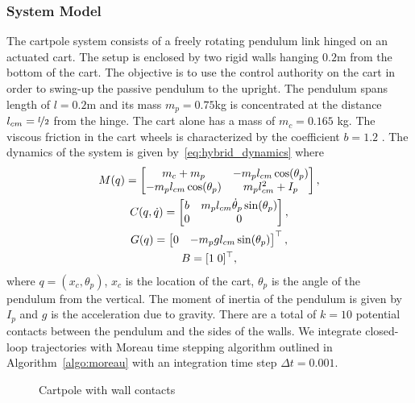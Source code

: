 \subsubsection{System Model}
\label{sssec:cartpole_model}

The cartpole system consists of a freely rotating pendulum link hinged on an
actuated cart.
%
The setup is enclosed by two rigid walls hanging $0.2$m from the bottom of the
cart.
%
The objective is to use the control authority on the cart in order to swing-up
the passive pendulum to the upright.
%
The pendulum spans length of $l=0.2$m and its mass $m_p = 0.75$kg is
concentrated at the distance $l_{cm}=\nicefrac{l}{2}$ from the hinge.
%
The cart alone has a mass of $m_c=0.165$ kg. The viscous friction in the cart
wheels is characterized by the coefficient $b=1.2$ .
%
The dynamics of the system is given by~\eqref{eq:hybrid_dynamics} where 
%
\begin{equation}
    \begin{gathered}
    M(q) = \begin{bmatrix}m_c + m_p & -m_p l_{cm} \cos(\theta_p) \\
        -m_pl_{cm}\cos(\theta_p) & m_p l_{cm}^2+I_p\end{bmatrix}, \\
    C(q, \dot{q}) = \begin{bmatrix}b  & m_pl_{cm}\dot{\theta}_p\sin(\theta_p) \\
        0 & 0\end{bmatrix}, \\
    G(q) = \begin{bmatrix}0 & -m_pg l_{cm} \sin(\theta_p)\end{bmatrix}^\top, \\
        B = [1 \; 0]^\top,
    \end{gathered}
\end{equation}
\noindent where $q = (x_c, \theta_p)$, $x_c$ is the location of the cart,
$\theta_p$ is the angle of the pendulum from the vertical. The moment of inertia
of the pendulum is given by $I_p$ and $g$ is the acceleration due to gravity. 
%
There are a total of $k=10$ potential contacts between the pendulum and the sides of
the walls.
%
We integrate closed-loop trajectories with Moreau time stepping algorithm
outlined in Algorithm~\eqref{algo:moreau} with an integration time step $\Delta
t=0.001$.
%
\begin{figure}[tb]
    \centering
    \caption{Cartpole with wall contacts}
    \label{fig:cartpole_contact}
\end{figure}

